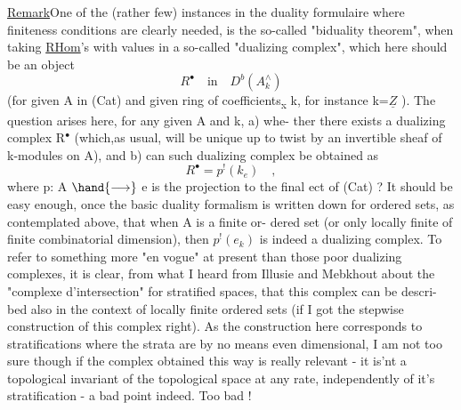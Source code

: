 
\uline{Remark}One of the (rather few) instances in the duality formulaire
where finiteness conditions are clearly needed,  is the so-called
"biduality theorem",  when taking \uline{RHom}'s with values in a so-called
"dualizing complex",  which here should be an object 
\[ R^{\bullet} \quad \text{in} \quad D^{b}(A^{\wedge}_{k}) \]
(for given A in (Cat) and given ring of coefficients\textsubscript{x} k,  for instance
k=$\underline{Z}$  ).  The question arises here,  for any given A and k,  a) whe-%
ther there exists a dualizing complex R$^{\bullet}$  (which,as usual,  will be
unique up to  twist by an invertible sheaf of k-modules on A),  and
b) can such dualizing complex be obtained as
\[ R^{\bullet} = p^{!}(k_{e}) \quad , \]
where  p: A $\hand{\longrightarrow}$ e is the projection to the final ect of (Cat) ?  It
should be easy enough,  once the basic duality formalism is written down
for ordered sets,  as contemplated above,  that when A is a finite or-%
dered set (or only locally finite of finite combinatorial dimension),
then $p^{!}(e_{k})$  is indeed a dualizing complex.  To refer to something
more "en vogue" at present than those poor dualizing complexes,  it is
clear,  from what I heard from Illusie and Mebkhout about the "complexe
d'intersection" for stratified spaces,  that this complex can be descri-%
bed also in the context of locally finite ordered sets (if I got the
stepwise construction of this complex right).  As the construction
here corresponds to stratifications where the strata are by no means
even dimensional,  I am not too sure though if the complex obtained this
way is really relevant  -  it is'nt a topological invariant of the
topological space at any rate,  independently of it's stratification -
a bad point indeed. Too bad !

